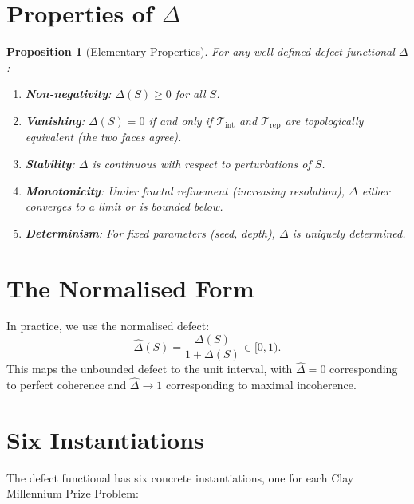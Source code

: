 \documentclass[12pt, openany]{book}
\newtheorem{proposition}[theorem]{Proposition}
\theoremstyle{remark}
\newcommand{\Tint}{\mathcal{T}_{\mathrm{int}}}
\newcommand{\Trep}{\mathcal{T}_{\mathrm{rep}}}
\begin{document}
\section{Properties of $\Delta$}

\begin{proposition}[Elementary Properties]
\label{prop:delta-props}
For any well-defined defect functional $\Delta$:
\begin{enumerate}
  \item \textbf{Non-negativity}: $\Delta(S) \geq 0$ for all $S$.
  \item \textbf{Vanishing}: $\Delta(S) = 0$ if and only if $\Tint$ and $\Trep$ are
        topologically equivalent (the two faces agree).
  \item \textbf{Stability}: $\Delta$ is continuous with respect to perturbations of $S$.
  \item \textbf{Monotonicity}: Under fractal refinement (increasing resolution),
        $\Delta$ either converges to a limit or is bounded below.
  \item \textbf{Determinism}: For fixed parameters (seed, depth), $\Delta$ is
        uniquely determined.
\end{enumerate}
\end{proposition}

\section{The Normalised Form}

In practice, we use the normalised defect:
\[
  \hat{\Delta}(S) = \frac{\Delta(S)}{1 + \Delta(S)} \in [0, 1).
\]
This maps the unbounded defect to the unit interval, with $\hat{\Delta} = 0$
corresponding to perfect coherence and $\hat{\Delta} \to 1$ corresponding to
maximal incoherence.

\section{Six Instantiations}

The defect functional has six concrete instantiations, one for each Clay Millennium
Prize Problem:
\end{document}
